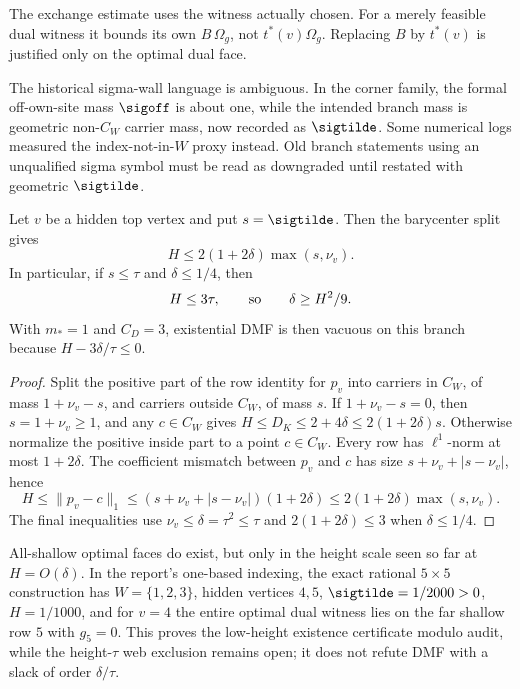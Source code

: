 \begin{warning}
\provedbadge\label{warn:feasible-optimal-gap}
The exchange estimate uses the witness actually chosen.  For a merely
feasible dual witness it bounds its own \(B\,\Omega_g\), not
\(t^*(v)\Omega_g\).  Replacing \(B\) by \(t^*(v)\) is justified only on
the optimal dual face.
\end{warning}

\begin{warning}
\downgradedbadge\label{warn:old-sigma}
The historical sigma-wall language is ambiguous.  In the corner family,
the formal off-own-site mass \(\sigoff\) is about one, while the intended
branch mass is geometric non-\(C_W\) carrier mass, now recorded as
\(\sigtilde\).  Some numerical logs measured the index-not-in-\(W\)
proxy instead.  Old branch statements using an unqualified sigma symbol
must be read as downgraded until restated with geometric \(\sigtilde\).
\end{warning}

\begin{proposition}
\provedbadge\label{prop:sigtilde-height-cap}
Let \(v\) be a hidden top vertex and put \(s=\sigtilde\).  Then the
barycenter split gives
\[
        H\le 2(1+2\delta)\max(s,\nu_v).
\]
In particular, if \(s\le\tau\) and \(\delta\le1/4\), then
\[
        H\le 3\tau,\qquad\hbox{so}\qquad \delta\ge H^2/9 .
\]
With \(m_*=1\) and \(C_D=3\), existential DMF is then vacuous on this
branch because \(H-3\delta/\tau\le0\).
\end{proposition}

\begin{proof}
Split the positive part of the row identity for \(p_v\) into carriers in
\(C_W\), of mass \(1+\nu_v-s\), and carriers outside \(C_W\), of mass
\(s\).  If \(1+\nu_v-s=0\), then \(s=1+\nu_v\ge1\), and any
\(c\in C_W\) gives \(H\le D_K\le2+4\delta\le2(1+2\delta)s\).  Otherwise
normalize the positive inside part to a point \(c\in C_W\).  Every row has
\(\ell^1\)-norm at most \(1+2\delta\).  The coefficient mismatch between
\(p_v\) and \(c\) has size \(s+\nu_v+|s-\nu_v|\), hence
\[
        H\le\|p_v-c\|_1
        \le (s+\nu_v+|s-\nu_v|)(1+2\delta)
        \le 2(1+2\delta)\max(s,\nu_v).
\]
The final inequalities use \(\nu_v\le\delta=\tau^2\le\tau\) and
\(2(1+2\delta)\le3\) when \(\delta\le1/4\).
\end{proof}

\begin{warning}
\modauditbadge\label{warn:all-shallow-height}
All-shallow optimal faces do exist, but only in the height scale seen so
far at \(H=O(\delta)\).  In the report's one-based indexing, the exact
rational \(5\times5\) construction has \(W=\{1,2,3\}\), hidden vertices
\(4,5\), \(\sigtilde=1/2000>0\), \(H=1/1000\), and for \(v=4\) the
entire optimal dual witness lies on the far shallow row \(5\) with
\(g_5=0\).  This proves the low-height existence certificate modulo audit,
while the height-\(\tau\) web exclusion remains open; it does not refute DMF
with a slack of order \(\delta/\tau\).
\end{warning}

